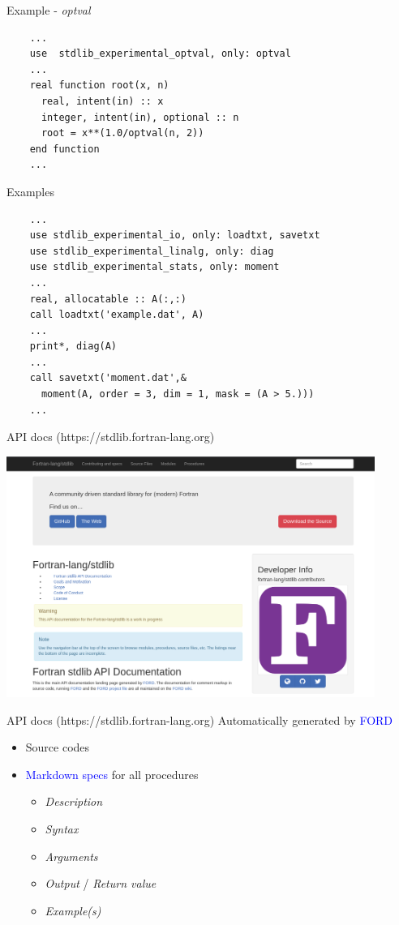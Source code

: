 \documentclass{beamer}
\begin{document}
\begin{frame}[fragile]{Example - \textit{optval}}
	\begin{lstlisting}
	...
	use  stdlib_experimental_optval, only: optval
	...
	real function root(x, n)
	  real, intent(in) :: x
	  integer, intent(in), optional :: n
	  root = x**(1.0/optval(n, 2))
	end function
	...	\end{lstlisting}
\end{frame}


\begin{frame}[fragile]{Examples}
	\begin{lstlisting}
	...
	use stdlib_experimental_io, only: loadtxt, savetxt
	use stdlib_experimental_linalg, only: diag
	use stdlib_experimental_stats, only: moment
	...
	real, allocatable :: A(:,:)
	call loadtxt('example.dat', A)
	...
	print*, diag(A)
	...
 	call savetxt('moment.dat',&
	  moment(A, order = 3, dim = 1, mask = (A > 5.)))
	...	\end{lstlisting}
\end{frame}


\begin{frame}[c]{API docs (https://stdlib.fortran-lang.org)}
	\begin{center}
	\includegraphics[width=0.9\textwidth]{apidocsstdlib}
	\end{center}
\end{frame}


\begin{frame}[c]{API docs (https://stdlib.fortran-lang.org)}
	Automatically generated by \textcolor{blue}{FORD} %
	\begin{itemize}
		\item Source codes
		\item \textcolor{blue}{Markdown specs} for all procedures
		\begin{itemize}
			\item \textit{Description}
			\item \textit{Syntax}
			\item \textit{Arguments}
			\item \textit{Output} / \textit{Return value}
			\item \textit{Example(s)}
		\end{itemize}
	\end{itemize}

\end{frame}
\end{document}
